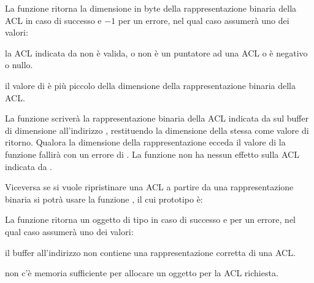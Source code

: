 \begin{funcproto}{
}

{La funzione ritorna la dimensione in byte della rappresentazione binaria
  della ACL in caso di successo e $-1$ per un errore, nel qual caso
   assumerà uno dei valori:
  \begin{errlist}
  \item[\errcode{EINVAL}] la ACL indicata da  non è valida, o
     non è un puntatore ad una ACL o  è negativo o
    nullo.
  \item[\errcode{ERANGE}] il valore di  è più piccolo della
    dimensione della rappresentazione binaria della ACL.
  \end{errlist}
}  
\end{funcproto}

La funzione scriverà la rappresentazione binaria della ACL indicata da
 sul buffer di dimensione  all'indirizzo
, restituendo la dimensione della stessa come valore di
ritorno. Qualora la dimensione della rappresentazione ecceda il valore di
 la funzione fallirà con un errore di . La
funzione non ha nessun effetto sulla ACL indicata da .

Viceversa se si vuole ripristinare una ACL a partire da una rappresentazione
binaria si potrà usare la funzione , il cui prototipo è:

\begin{funcproto}{
}

{La funzione ritorna un oggetto di tipo  in caso di successo e
   per un errore, nel qual caso  assumerà uno dei valori:
  \begin{errlist}
  \item[\errcode{EINVAL}] il buffer all'indirizzo  non contiene
    una rappresentazione corretta di una ACL.
  \item[\errcode{ENOMEM}] non c'è memoria sufficiente per allocare un oggetto
     per la ACL richiesta.
  \end{errlist}
}
\end{funcproto}

